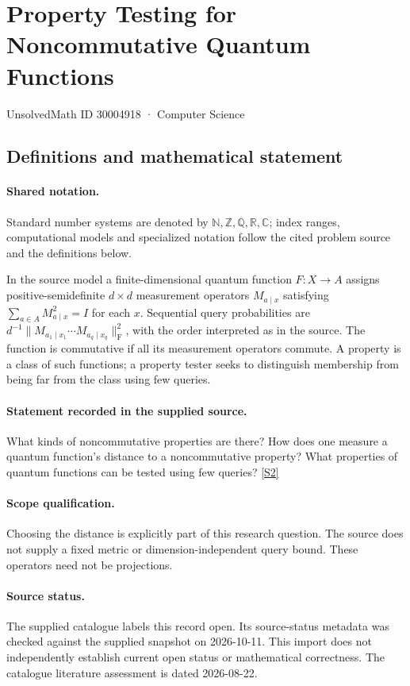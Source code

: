 \documentclass[11pt]{article}
\newcommand{\sref}[2]{\hyperlink{source:#1:#2}{[S#2]}}
\begin{document}
\setcounter{section}{30004917}
\section{Property Testing for Noncommutative Quantum Functions}\label{30004918}
{\small\sffamily UnsolvedMath ID 30004918 · Computer Science}
\subsection{Definitions and mathematical statement}

\paragraph{Shared notation.}Standard number systems are denoted by $\mathbb N,\mathbb Z,\mathbb Q,\mathbb R,\mathbb C$; index ranges, computational models and specialized notation follow the cited problem source and the definitions below.


In the source model a finite-dimensional quantum function $F:X\to A$ assigns positive-semidefinite $d\times d$ measurement operators $M_{a\mid x}$ satisfying $\sum_{a\in A}M_{a\mid x}^2=I$ for each $x$. Sequential query probabilities are $d^{-1}\|M_{a_1\mid x_1}\cdots M_{a_q\mid x_q}\|_{\mathrm F}^2$, with the order interpreted as in the source. The function is commutative if all its measurement operators commute. A property is a class of such functions; a property tester seeks to distinguish membership from being far from the class using few queries.
\paragraph{Statement recorded in the supplied source.}
What kinds of noncommutative properties are there? How does one measure a quantum function’s distance to a noncommutative property? What properties of quantum functions can be tested using few queries? \sref{30004918}{2}
\paragraph{Scope qualification.}
Choosing the distance is explicitly part of this research question. The source does not supply a fixed metric or dimension-independent query bound. These operators need not be projections.
\paragraph{Source status.}
The supplied catalogue labels this record open. Its source-status metadata was checked against the supplied snapshot on 2026-10-11. This import does not independently establish current open status or mathematical correctness. The catalogue literature assessment is dated 2026-08-22.
\end{document}
